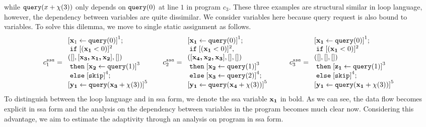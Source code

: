 {while ${\tt query}(x+\chi(3))$ only depends on ${\tt query}(0)$ at line $1$ in program $c_3$. 
These three examples are structural similar in loop language, however, the dependency between variables are quite dissimilar. We consider variables here because query request is also bound to variables. To solve this dilemma, we move to single static assignment as follows.   
\[
 c_1^{ssa} = \begin{array}{l}
      \clabel{ \assign{{\ssa{x}_1}}{\query(0)}}^{1} ; \\
      \eif  [({\ssa{x_1} }< 0 )]^{2}\\
      ([], [{ \ssa{x_3, x_1,x_2} }], []) \\
      \ethen \clabel{\assign{{\ssa{x_2}}}{\query(1)}}^{3}\\
      \eelse \clabel{\eskip}^{4} ; \\
      \clabel{\assign{{\ssa{y_1}}}{\query({\ssa{x_3} + \chi(3)})}}^{5}
 \end{array}
 ~~~~~
  c_2^{ssa} = \begin{array}{l}
      \clabel{ \assign{{\ssa{x_1}}}{\query(0)}}^{1} ; \\
      \eif  [({\ssa{x_1}} < 0 )]^{2}, \\
      ( [{\ssa{x_4, x_2,x_3}}], [], [] ) \\
      \ethen \clabel{\assign{{\ssa{x_2}}}{\query(1)}}^{3}\\
      \eelse \clabel{\assign{{\ssa{x_3}}}{\query(2)}}^{4} ; \\
      \clabel{\assign{{\ssa{y_1}}}{\query({\ssa{x_4}}+\chi(3))}}^{5}
 \end{array}
 ~~~~~~~~
  c_3^{ssa} = \begin{array}{l}
      \clabel{ \assign{{\ssa{x_1}}}{\query(0)}}^{1} ; \\
      \eif  [({\ssa{x_1}} < 0 )]^{2} \\
       ( [], [], [] ) \\
      \ethen \clabel{\assign{{\ssa{z_1}}}{\query(1)}}^{3}\\
      \eelse \clabel{\eskip}^{4} ; \\
      \clabel{\assign{{\ssa{y_1}}}{\query({\ssa{x_1}}+\chi(3))}}^{5}
 \end{array}
\]
To distinguish between the loop language and in ssa form, we denote the ssa variable ${{\boldsymbol{\mathbf{x_1}}}}$ in bold. As we can see, the data flow becomes explicit in ssa form and the analysis on the dependency between variables in the program becomes much clear now. Considering this advantage, we aim to estimate the adaptivity through an analysis on program in ssa form. 
}
%
